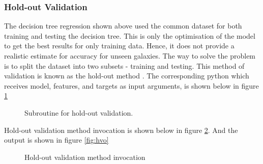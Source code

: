 \subsubsection{Hold-out Validation}
The decision tree regression shown above used the common dataset for both training and testing the decision tree. This is only the optimisation of the model to get the best results for only training data. Hence, it does not provide a realistic estimate for accuracy for unseen galaxies. The way to solve the problem is to split the dataset into two subsets - training and testing. This method of validation is known as the hold-out method \parencite{schneider_cross_2019}. The corresponding python  which receives model, features, and targets as input arguments, is shown below in figure \ref{fig:hov}
\begin{figure}[H]
	\centering
	\caption{Subroutine for hold-out validation.}
	\label{fig:hov}
\end{figure}
Hold-out validation method invocation is shown below in figure \ref{fig:hvc}. And the output is shown in figure \ref{fig:hvo}
\begin{figure}[H]
	\centering
	\caption{Hold-out validation method invocation}
	\label{fig:hvc}
\end{figure}
